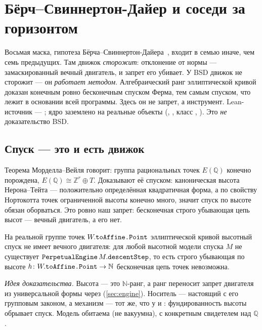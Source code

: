 \section{Бёрч–Свиннертон-Дайер и соседи за горизонтом}\label{sec:bsd}

Восьмая маска, гипотеза Бёрча–Свиннертон-Дайера~\cite{clay-bsd}, входит в семью иначе,
чем семь предыдущих. Там движок \emph{сторожит}: отклонение от нормы — замаскированный вечный
двигатель, и запрет его убивает. У BSD движок не сторожит — он \emph{работает методом}.
Алгебраический ранг эллиптической кривой доказан конечным ровно бесконечным спуском Ферма, тем самым
спуском, что лежит в основании всей программы. Здесь он не запрет, а инструмент. Lean-источник —
; ядро заземлено на реальные объекты 
(, , класс ,
). Это \emph{не} доказательство BSD.

\subsection{Спуск — это и есть движок}

Теорема Морделла–Вейля говорит: группа рациональных точек $E(\mathbb{Q})$ конечно порождена,
$E(\mathbb{Q})\cong\mathbb{Z}^r\oplus T$. Доказывают её спуском: каноническая высота Нерона–Тейта —
положительно определённая квадратичная форма, а по свойству Нортокотта точек ограниченной высоты
конечно много, значит спуск по высоте обязан оборваться. Это ровно наш запрет: бесконечная строго
убывающая цепь высот — вечный двигатель, а его нет.

\begin{theorem}\label{thm:bsd_descent_has_no_engine}
\green{} На реальной группе точек $W.\texttt{toAffine.Point}$ эллиптической кривой высотный спуск не
имеет вечного двигателя: для любой высотной модели спуска $M$ не существует
$\texttt{PerpetualEngine}\,M.\texttt{descentStep}$, то есть строго убывающая по высоте
$h\colon W.\texttt{toAffine.Point}\to\mathbb{N}$ бесконечная цепь точек невозможна.
\end{theorem}

\emph{Идея доказательства.} Высота — это $\mathbb{N}$-ранг, а ранг переносит запрет двигателя из
универсальной формы через 
(\cref{sec:engine}). Носитель — настоящий  с его групповым
законом, а механизм — тот же, что у  и :
фундированность высоты обрывает спуск. Модель обитаема (не вакуумна), с конкретным свидетелем над
$\mathbb{Q}$.


